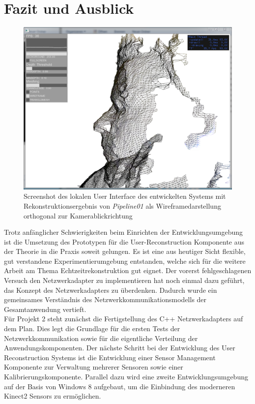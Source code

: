 \section{Fazit und Ausblick}
\begin{figure}[h]
	\begin{center}		
		\includegraphics[width=.5\textwidth, keepaspectratio]{img/screen}
		\caption{Screenshot des lokalen User Interface des entwickelten Systems mit Rekonstruktionsergebnis von \textit{Pipeline01} als Wireframedarstellung orthogonal zur Kamerablickrichtung}
		\label{fig:screen}
	\end{center}
\end{figure}
Trotz anfänglicher Schwierigkeiten beim Einrichten der Entwicklungsumgebung ist die Umsetzung des Prototypen für die User-Reconstruction Komponente aus der Theorie in die Praxis soweit gelungen. Es ist eine aus heutiger Sicht flexible, gut verstandene Experimentierumgebung entstanden, welche sich für die weitere Arbeit am Thema Echtzeitrekonstruktion gut eignet. Der vorerst fehlgeschlagenen Versuch den Netzwerkadapter zu implementieren hat noch einmal dazu geführt, das Konzept des Netzwerkadapters zu überdenken. Dadurch wurde ein gemeinsames Verständnis des Netzwerkkommunikationsmodells der Gesamtanwendung vertieft.\\
Für Projekt 2 steht zunächst die Fertigstellung des C++ Netzwerkadapters auf dem Plan. Dies legt die Grundlage für die ersten Tests der Netzwerkkommunikation sowie für die eigentliche Verteilung der Anwendungskomponenten. Der nächste Schritt bei der Entwicklung des User Reconstruction Systems ist die Entwicklung einer Sensor Management Komponente zur Verwaltung mehrerer Sensoren sowie einer Kalibrierungskomponente. Parallel dazu wird eine zweite Entwicklungsumgebung auf der Basis von Windows 8 aufgebaut, um die Einbindung des moderneren Kinect2 Sensors zu ermöglichen.
